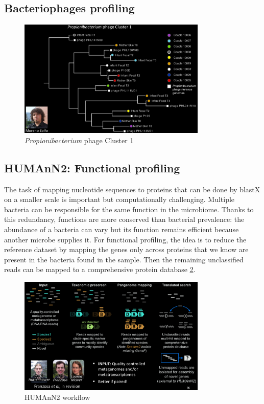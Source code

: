     \subsection{Bacteriophages profiling}

    \begin{figure}[H]
        \centering
        \includegraphics[width=0.8\textwidth]{phages.png}
        \caption{\label{fig:phages}\emph{Propionibacterium} phage Cluster 1}
    \end{figure}

    \subsection{HUMAnN2: Functional profiling}
    The task of mapping nucleotide sequences to proteins that can be done by blastX on a smaller scale is important but computationally challenging.
    Multiple bacteria can be responsible for the same function in the microbiome.
    Thanks to this redundancy, functions are more conserved than bacterial prevalence: the abundance of a bacteria can vary but its function remains efficient because another microbe supplies it.
    For functional profiling, the idea is to reduce the reference dataset by mapping the genes only across proteins that we know are present in the bacteria found in the sample.
    Then the remaining unclassified reads can be mapped to a comprehensive protein database \ref{fig:human2}.

    \begin{figure}[!h]
        \centering
        \includegraphics[width=0.8\textwidth]{human2.png}
        \caption{\label{fig:human2}HUMAnN2 workflow}
    \end{figure}
